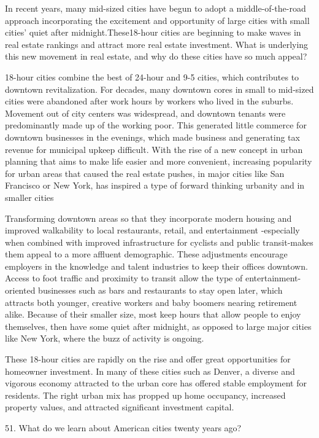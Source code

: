 \documentclass[UTF8,11pt]{ctexart}
\begin{document}
In recent years, many mid-sized cities have begun to adopt a middle-of-the-road approach incorporating the excitement and opportunity of large cities with small cities’ quiet after midnight.These18-hour cities are beginning to make waves in real estate rankings and attract more real estate investment. What is underlying this new movement in real estate, and why do these cities have so much appeal?


18-hour cities combine the best of 24-hour and 9-5 cities, which contributes to downtown revitalization. For decades, many downtown cores in small to mid-sized cities were abandoned after work hours by workers who lived in the suburbs. Movement out of city centers was widespread, and downtown tenants were predominantly made up of the working poor. This generated little commerce for downtown businesses in the evenings, which made business and generating tax revenue for municipal upkeep difficult. With the rise of a new concept in urban planning that aims to make life easier and more convenient, increasing popularity for urban areas that caused the real estate pushes, in major cities like San Francisco or New York, has inspired a type of forward thinking urbanity and in smaller cities


Transforming downtown areas so that they incorporate modern housing and improved walkability to local restaurants, retail, and entertainment -especially when combined with improved infrastructure for cyclists and public transit-makes them appeal to a more affluent demographic. These adjustments encourage employers in the knowledge and talent industries to keep their offices downtown. Access to foot traffic and proximity to transit allow the type of entertainment-oriented businesses such as bars and restaurants to stay open later, which attracts both younger, creative workers and baby boomers nearing retirement alike. Because of their smaller size, most keep hours that allow people to enjoy themselves, then have some quiet after midnight, as opposed to large major cities like New York, where the buzz of activity is ongoing.


These 18-hour cities are rapidly on the rise and offer great opportunities for homeowner investment. In many of these cities such as Denver, a diverse and vigorous economy attracted to the urban core has offered stable employment for residents. The right urban mix has propped up home occupancy, increased property values, and attracted significant investment capital.


51. What do we learn about American cities twenty years ago?
\end{document}
